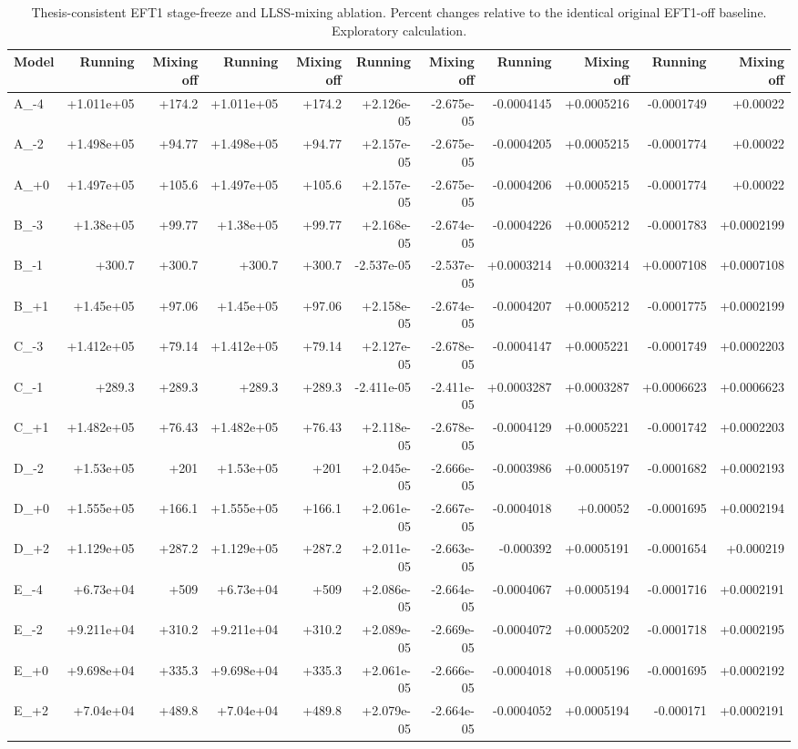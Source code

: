 \begin{table}[htbp]
\centering
\scriptsize
\begin{tabular}{lrrrrrrrrrr}
\hline
Model & Running & Mixing off & Running & Mixing off & Running & Mixing off & Running & Mixing off & Running & Mixing off \\
\hline
A\_-4 & +1.011e+05 & +174.2 & +1.011e+05 & +174.2 & +2.126e-05 & -2.675e-05 & -0.0004145 & +0.0005216 & -0.0001749 & +0.00022 \\
A\_-2 & +1.498e+05 & +94.77 & +1.498e+05 & +94.77 & +2.157e-05 & -2.675e-05 & -0.0004205 & +0.0005215 & -0.0001774 & +0.00022 \\
A\_+0 & +1.497e+05 & +105.6 & +1.497e+05 & +105.6 & +2.157e-05 & -2.675e-05 & -0.0004206 & +0.0005215 & -0.0001774 & +0.00022 \\
B\_-3 & +1.38e+05 & +99.77 & +1.38e+05 & +99.77 & +2.168e-05 & -2.674e-05 & -0.0004226 & +0.0005212 & -0.0001783 & +0.0002199 \\
B\_-1 & +300.7 & +300.7 & +300.7 & +300.7 & -2.537e-05 & -2.537e-05 & +0.0003214 & +0.0003214 & +0.0007108 & +0.0007108 \\
B\_+1 & +1.45e+05 & +97.06 & +1.45e+05 & +97.06 & +2.158e-05 & -2.674e-05 & -0.0004207 & +0.0005212 & -0.0001775 & +0.0002199 \\
C\_-3 & +1.412e+05 & +79.14 & +1.412e+05 & +79.14 & +2.127e-05 & -2.678e-05 & -0.0004147 & +0.0005221 & -0.0001749 & +0.0002203 \\
C\_-1 & +289.3 & +289.3 & +289.3 & +289.3 & -2.411e-05 & -2.411e-05 & +0.0003287 & +0.0003287 & +0.0006623 & +0.0006623 \\
C\_+1 & +1.482e+05 & +76.43 & +1.482e+05 & +76.43 & +2.118e-05 & -2.678e-05 & -0.0004129 & +0.0005221 & -0.0001742 & +0.0002203 \\
D\_-2 & +1.53e+05 & +201 & +1.53e+05 & +201 & +2.045e-05 & -2.666e-05 & -0.0003986 & +0.0005197 & -0.0001682 & +0.0002193 \\
D\_+0 & +1.555e+05 & +166.1 & +1.555e+05 & +166.1 & +2.061e-05 & -2.667e-05 & -0.0004018 & +0.00052 & -0.0001695 & +0.0002194 \\
D\_+2 & +1.129e+05 & +287.2 & +1.129e+05 & +287.2 & +2.011e-05 & -2.663e-05 & -0.000392 & +0.0005191 & -0.0001654 & +0.000219 \\
E\_-4 & +6.73e+04 & +509 & +6.73e+04 & +509 & +2.086e-05 & -2.664e-05 & -0.0004067 & +0.0005194 & -0.0001716 & +0.0002191 \\
E\_-2 & +9.211e+04 & +310.2 & +9.211e+04 & +310.2 & +2.089e-05 & -2.669e-05 & -0.0004072 & +0.0005202 & -0.0001718 & +0.0002195 \\
E\_+0 & +9.698e+04 & +335.3 & +9.698e+04 & +335.3 & +2.061e-05 & -2.666e-05 & -0.0004018 & +0.0005196 & -0.0001695 & +0.0002192 \\
E\_+2 & +7.04e+04 & +489.8 & +7.04e+04 & +489.8 & +2.079e-05 & -2.664e-05 & -0.0004052 & +0.0005194 & -0.000171 & +0.0002191 \\
\hline
\end{tabular}
\caption{Thesis-consistent EFT1 stage-freeze and LLSS-mixing ablation. Percent changes relative to the identical original EFT1-off baseline. Exploratory calculation.}
\end{table}
